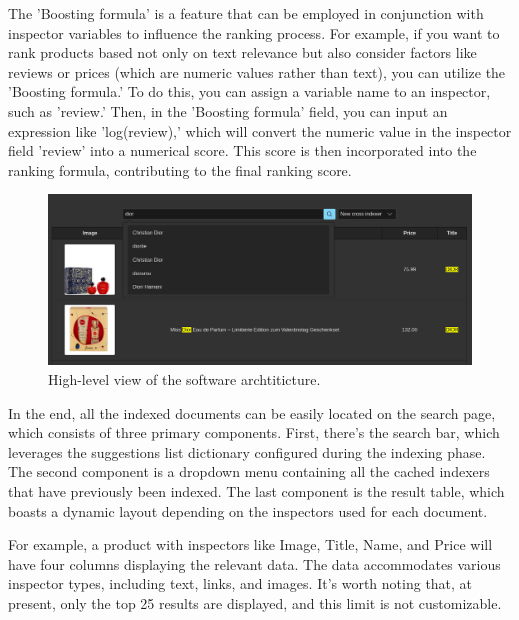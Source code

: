 The 'Boosting formula' is a feature that can be employed in conjunction with inspector variables to influence the ranking process. For example, if you want to rank products based not only on text relevance but also consider factors like reviews or prices (which are numeric values rather than text), you can utilize the 'Boosting formula.' To do this, you can assign a variable name to an inspector, such as 'review.' Then, in the 'Boosting formula' field, you can input an expression like 'log(review),' which will convert the numeric value in the inspector field 'review' into a numerical score. This score is then incorporated into the ranking formula, contributing to the final ranking score.

\begin{figure}[h]	
     \centering
     \includegraphics[width=13cm]{images/demo-12.png}
     \caption{High-level view of the software archtiticture.}
     \label{fig:software-arch}
\end{figure}

In the end, all the indexed documents can be easily located on the search page, which consists of three primary components. First, there's the search bar, which leverages the suggestions list dictionary configured during the indexing phase. The second component is a dropdown menu containing all the cached indexers that have previously been indexed. The last component is the result table, which boasts a dynamic layout depending on the inspectors used for each document.

For example, a product with inspectors like Image, Title, Name, and Price will have four columns displaying the relevant data. The data accommodates various inspector types, including text, links, and images. It's worth noting that, at present, only the top 25 results are displayed, and this limit is not customizable.